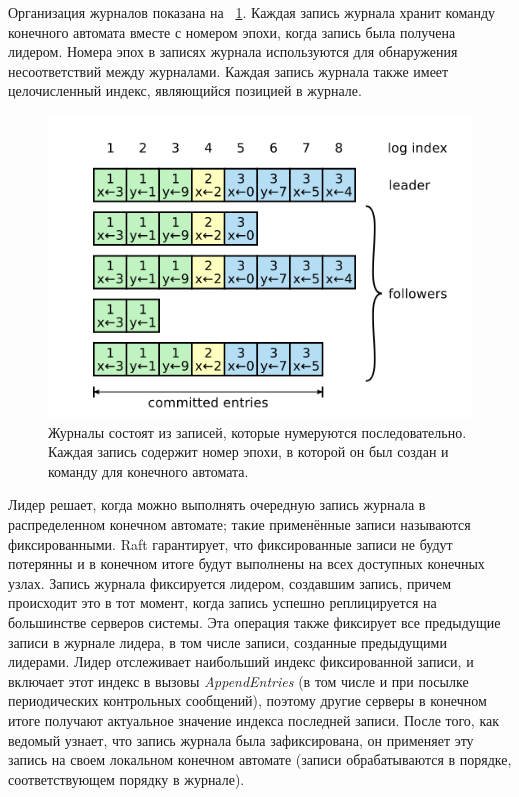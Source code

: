 \documentclass[subf, href, colorlinks=true, 14pt,
times, mtpro, specialist]{disser}
\newcommand{\figref}[1]{\figurename~\ref{#1}}
\theoremstyle{definition}
\begin{document}
Организация журналов показана на \figref{fig:log_1}. Каждая запись журнала хранит команду конечного автомата вместе с номером эпохи, когда запись была получена лидером. Номера эпох в записях журнала используются для обнаружения несоответствий между журналами. Каждая запись журнала также имеет целочисленный индекс, являющийся позицией в журнале.

\begin{figure}[h]
\centering
\includegraphics[width=1\textwidth]{src/pics/log_1.png}
\caption{Журналы состоят из записей, которые нумеруются последовательно. Каждая запись содержит номер эпохи, в которой он был создан и команду для конечного автомата.}
\label{fig:log_1}
\end{figure}

Лидер решает, когда можно выполнять очередную запись журнала в распределенном конечном автомате; такие применённые записи называются фиксированными. Raft гарантирует, что фиксированные записи не будут потерянны и в конечном итоге будут выполнены на всех доступных конечных узлах. Запись журнала фиксируется лидером, создавшим запись, причем происходит это в тот момент, когда запись успешно реплицируется на большинстве серверов системы. Эта операция также фиксирует все предыдущие записи в журнале лидера, в том числе записи, созданные предыдущими лидерами. Лидер отслеживает наибольший индекс фиксированной записи, и включает этот индекс в вызовы \textit{AppendEntries} (в том числе и при посылке периодических контрольных сообщений), поэтому другие серверы в конечном итоге получают актуальное значение индекса последней записи. После того, как ведомый узнает, что запись журнала была зафиксирована, он применяет эту запись на своем локальном конечном автомате (записи обрабатываются в порядке, соответствующем порядку в журнале).
\end{document}
